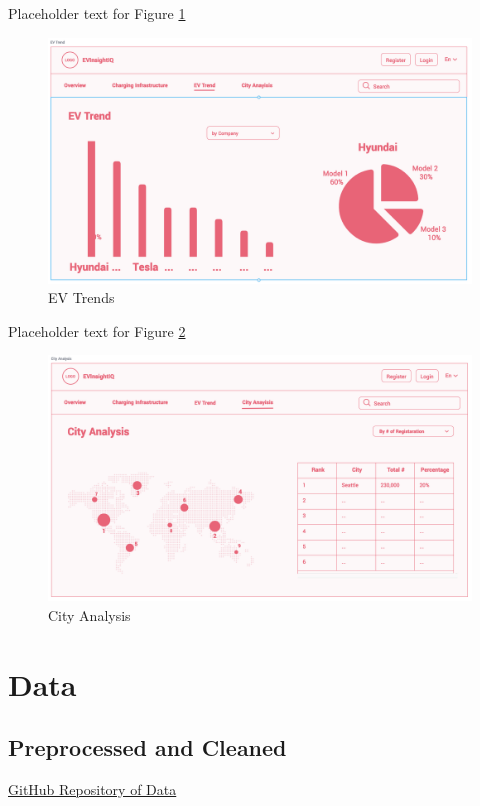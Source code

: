 \documentclass{article}
\begin{document}
Placeholder text for Figure \ref{fig:evtrends}
\begin{figure}[h]
    \centering
    \includegraphics[scale=0.25]{EV Trends}
    \caption{EV Trends}
    \label{fig:evtrends}
\end{figure}

Placeholder text for Figure \ref{fig:city}
\begin{figure}[h]
    \centering
    \includegraphics[scale=0.25]{City Analysis}
    \caption{City Analysis}
    \label{fig:city}
\end{figure}

\section*{Data}
\subsection*{Preprocessed and Cleaned}
\href{https://github.com/mk-imagine/csc805g5/tree/main/data}{GitHub Repository of Data}
\end{document}

